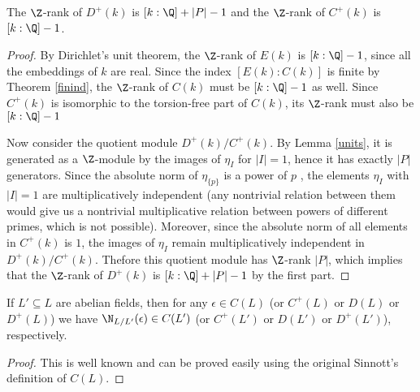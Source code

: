 \begin{prop}\label{Drank}
The $\Z$-rank of $D^+(k)$ is $[k:\Q]+|P|-1$ and the $\Z$-rank of $C^+(k)$ is $[k:\Q]-1$.
\end{prop}
\begin{proof}
By Dirichlet's unit theorem, the $\Z$-rank of $E(k)$ is $[k:\Q]-1$, since all the embeddings of $k$ are real. Since the index $[E(k):C(k)]$ is finite by Theorem \ref{finind},  the $\Z$-rank of $C(k)$ must be $[k:\Q]-1$ as well. Since $C^+(k)$ is isomorphic to the torsion-free part of $C(k)$, its $\Z$-rank must also be $[k:\Q]-1$

Now consider the quotient module $D^+(k)/C^+(k)$. By Lemma \ref{units}, it is generated as a $\Z$-module by the images of $\eta_I$ for $|I|=1$, hence it has exactly $|P|$ generators. Since the absolute norm of $\eta_{\{p\}}$ is a power of $p$%
, the elements $\eta_I$ with $|I|=1$ are multiplicatively independent (any nontrivial relation between them would give us a nontrivial multiplicative relation between powers of different primes, which is not possible). Moreover, since the absolute norm of all elements in $C^+(k)$ is $1$, the images of $\eta_I$ remain multiplicatively independent in $D^+(k)/C^+(k)$. Thefore this quotient module has $\Z$-rank $|P|$, which implies that the $\Z$-rank of $D^+(k)$ is $[k:\Q]+|P|-1$ by the first part.
\end{proof}

\begin{lemma}\label{NoFrob}
If $L' \subseteq L$ are abelian fields, then for any $\epsilon\in C(L)$ (or $C^+(L)$ or $D(L)$ or $D^+(L)$) we have $\N_{L/L'}(\epsilon)\in C(L')$ (or $C^+(L')$ or $D(L')$ or $D^+(L')$), respectively.
\end{lemma}
\begin{proof}
This is well known and can be proved easily using the original Sinnott's definition of $C(L)$.
\end{proof}


